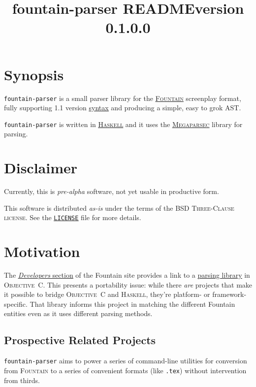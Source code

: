 \documentclass[11pt]{article}
\newcommand{\link}[2]{\underline{\color{darkblue}\href{#1}{#2}}}
\newcommand{\fpversion}{0.1.0.0}
\begin{document}
\title{fountain-parser README\linebreak\linebreak\small{version \fpversion}}
\author{}
\date{}
\maketitle

\section*{Synopsis} \texttt{fountain-parser} is a small parser library
for the \link{https://fountain.io/}{\textsc{Fountain}} screenplay
format, fully supporting 1.1 version
\link{https://fountain.io/syntax/}{syntax} and producing a simple, easy
to grok \textsc{AST}\@.

\texttt{fountain-parser} is written in
\link{https://haskell.org}{\textsc{Haskell}} and it uses the
\link{https://hackage.haskell.org/package/megaparsec}{\textsc{Megaparsec}}
library for parsing.

\section*{Disclaimer}
Currently, this is \emph{pre-alpha} software, not yet usable in
productive form.

This software is distributed \emph{as-is} under the terms of the
\textsc{BSD Three-Clause license}.  See the
\link{run:./LICENSE}{\texttt{LICENSE}} file for more details.

\section*{Motivation}
The
\link{https://fountain.io/developers/}{\emph{Developers} section} of the
Fountain site provides a link to a
\link{https://github.com/nyousefi/Fountain}{parsing library} in
\textsc{Objective~C}\@. This presents a portability issue: while there
\emph{are} projects that make it possible to bridge \textsc{Objective~C}
and \textsc{Haskell}, they’re platform- or framework-specific.  That
library informs this project in matching the different Fountain entities
even as it uses different parsing methods.

\subsection*{Prospective Related Projects}
\texttt{fountain-parser} aims to power a series of command-line
utilities for conversion from \textsc{Fountain} to a series of
convenient formats (like \texttt{.tex}) without intervention
from thirds.
\end{document}
